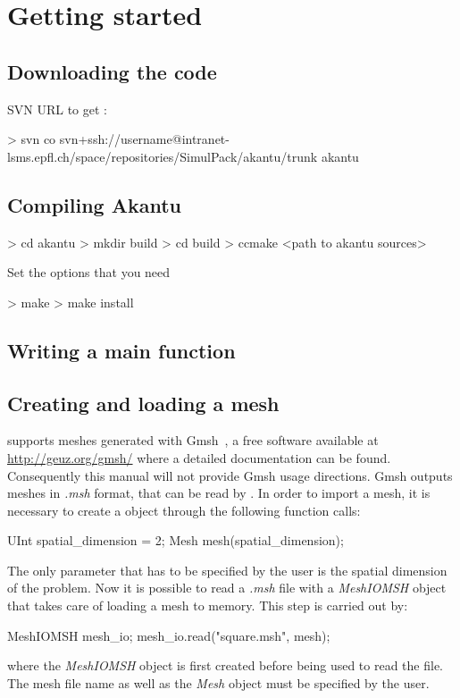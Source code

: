 \chapter{Getting started}
\section{Downloading the code}
SVN URL to get \akantu :
\begin{command}
  > svn co svn+ssh://username@intranet-lsms.epfl.ch/space/repositories/SimulPack/akantu/trunk akantu
\end{command}

\section{Compiling Akantu}
\begin{command}
  > cd akantu
  > mkdir build
  > cd build
  > ccmake <path to akantu sources>
\end{command}

Set the options that you need

\begin{command}
  > make
  > make install
\end{command}

\section{Writing a main function\label{sect:common:main}}


\section{Creating and loading a mesh\label{sect:common:mesh}}

\akantu supports meshes generated with Gmsh~\cite{gmsh}, a free
software available at \url{http://geuz.org/gmsh/} where a detailed 
documentation can be found. Consequently this manual will not provide
Gmsh usage directions. Gmsh outputs meshes in \textit{.msh} format, that can be read
by \akantu. In order to import a mesh, it is necessary to create
a  object through the following function calls:
\begin{cpp}
  UInt spatial_dimension = 2;
  Mesh mesh(spatial_dimension);
\end{cpp}
The only parameter that has to be specified by the user is the spatial
dimension of the problem. Now it is possible to read a \textit{.msh} file with
a \textit{MeshIOMSH} object that takes care of loading a mesh to memory. 
This step is carried out by:
\begin{cpp}
  MeshIOMSH mesh_io;
  mesh_io.read("square.msh", mesh);
\end{cpp}
where the \textit{MeshIOMSH} object is first created before being 
used to read the  file. The mesh file name as well as the \textit{Mesh}
object must be specified by the user. 

